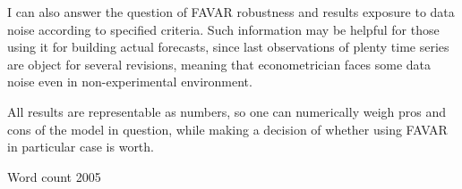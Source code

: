 \documentclass[a4paper, 14pt]{article}
\begin{document}
I can also answer the question of FAVAR robustness and results exposure to data noise according to specified criteria. Such information may be helpful for those using it for building actual forecasts, since last observations of plenty time series are object for several revisions, meaning that econometrician faces some data noise even in non-experimental environment. 

All results are representable as numbers, so one can numerically weigh pros and cons of the model in question, while making a decision of whether using FAVAR in particular case is worth.

Word count 2005

\newpage


\end{document}
